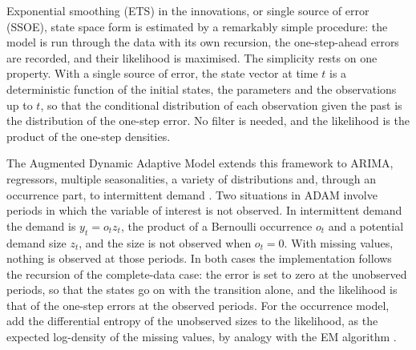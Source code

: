 \documentclass[11pt,a4paper]{article}
\theoremstyle{remark}
\begin{document}
Exponential smoothing (ETS) in the innovations, or single source of error (SSOE), state space form
\citep{Snyder1985,OrdKoehlerSnyder1997,Hyndman2008} is estimated by a remarkably simple procedure:
the model is run through the data with its own recursion, the one-step-ahead errors are recorded,
and their likelihood is maximised. The simplicity rests on one property. With a single source of
error, the state vector at time $t$ is a deterministic function of the initial states, the
parameters and the observations up to $t$, so that the conditional distribution of each observation
given the past is the distribution of the one-step error. No filter is needed, and the likelihood is
the product of the one-step densities.

The Augmented Dynamic Adaptive Model \citep[ADAM,][]{ADAM} extends this framework to ARIMA,
regressors, multiple seasonalities, a variety of distributions and, through an occurrence part, to
intermittent demand \citep[iETS,][]{iETS}. Two situations in ADAM involve periods in which the
variable of interest is not observed. In intermittent demand the demand is $y_t = o_t z_t$, the
product of a Bernoulli occurrence $o_t$ and a potential demand size $z_t$, and the size is not
observed when $o_t = 0$. With missing values, nothing is observed at those periods. In both cases
the implementation follows the recursion of the complete-data case: the error is set to zero at the
unobserved periods, so that the states go on with the transition alone, and the likelihood is that of
the one-step errors at the observed periods. For the occurrence model, \citet{iETS} add the
differential entropy of the unobserved sizes to the likelihood, as the expected log-density of the
missing values, by analogy with the EM algorithm \citep{EM}.
\end{document}

